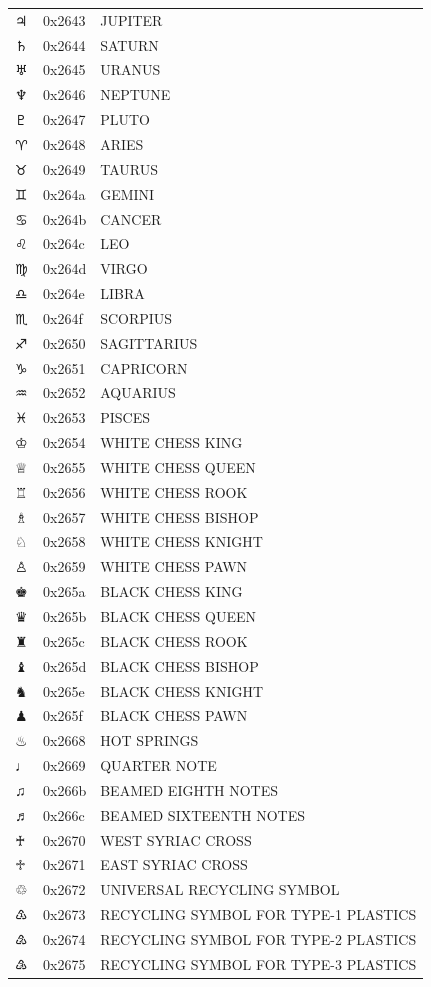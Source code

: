 \documentclass[12pt, twoside]{article}
\begin{document}
\begin{longtable}{L{1.0cm} L{2.0cm} >{\footnotesize}L{10cm}}
$♃$&0x2643&JUPITER\\
$♄$&0x2644&SATURN\\
$♅$&0x2645&URANUS\\
$♆$&0x2646&NEPTUNE\\
$♇$&0x2647&PLUTO\\
$♈$&0x2648&ARIES\\
$♉$&0x2649&TAURUS\\
$♊$&0x264a&GEMINI\\
$♋$&0x264b&CANCER\\
$♌$&0x264c&LEO\\
$♍$&0x264d&VIRGO\\
$♎$&0x264e&LIBRA\\
$♏$&0x264f&SCORPIUS\\
$♐$&0x2650&SAGITTARIUS\\
$♑$&0x2651&CAPRICORN\\
$♒$&0x2652&AQUARIUS\\
$♓$&0x2653&PISCES\\
$♔$&0x2654&WHITE CHESS KING\\
$♕$&0x2655&WHITE CHESS QUEEN\\
$♖$&0x2656&WHITE CHESS ROOK\\
$♗$&0x2657&WHITE CHESS BISHOP\\
$♘$&0x2658&WHITE CHESS KNIGHT\\
$♙$&0x2659&WHITE CHESS PAWN\\
$♚$&0x265a&BLACK CHESS KING\\
$♛$&0x265b&BLACK CHESS QUEEN\\
$♜$&0x265c&BLACK CHESS ROOK\\
$♝$&0x265d&BLACK CHESS BISHOP\\
$♞$&0x265e&BLACK CHESS KNIGHT\\
$♟$&0x265f&BLACK CHESS PAWN\\
$♨$&0x2668&HOT SPRINGS\\
$♩$&0x2669&QUARTER NOTE\\
$♫$&0x266b&BEAMED EIGHTH NOTES\\
$♬$&0x266c&BEAMED SIXTEENTH NOTES\\
$♰$&0x2670&WEST SYRIAC CROSS\\
$♱$&0x2671&EAST SYRIAC CROSS\\
$♲$&0x2672&UNIVERSAL RECYCLING SYMBOL\\
$♳$&0x2673&RECYCLING SYMBOL FOR TYPE-1 PLASTICS\\
$♴$&0x2674&RECYCLING SYMBOL FOR TYPE-2 PLASTICS\\
$♵$&0x2675&RECYCLING SYMBOL FOR TYPE-3 PLASTICS\\

\end{longtable}
\end{document}
